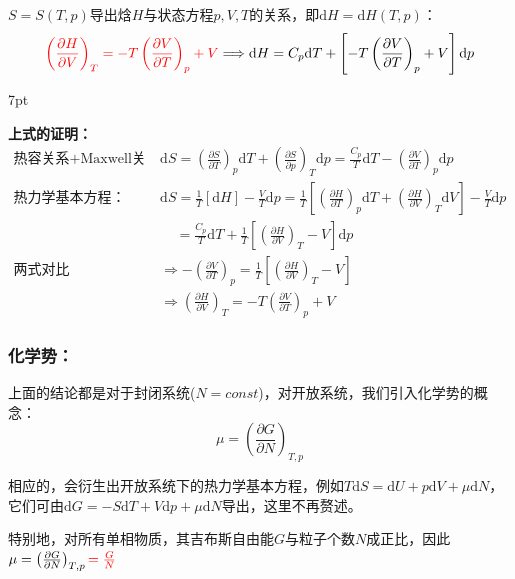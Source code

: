 \documentclass[zihao=5,UTF8]{report}
\newenvironment{graybox}{%
\def\FrameCommand{%
\hspace{1pt}%
{\color{gray}\small \vrule width 2pt}%
{\color{graybox_color}\vrule width 4pt}%
\colorbox{graybox_color}%
}%
\MakeFramed{\advance\hsize-\width\FrameRestore}%
\noindent\hspace{-4.55pt}%
\begin{adjustwidth}{}{7pt}%
\vspace{2pt}\vspace{2pt}%
}
{%
\vspace{2pt}\end{adjustwidth}\endMakeFramed%
}
\begin{document}
\noindent{} $S = S(T,p)$导出焓$H$与状态方程$p,V,T$的关系，即$\mathrm{d}H = \mathrm{d}H(T,p)$：
\begin{equation}
    {\color{red}\left(\frac{\partial H }{\partial V }\right)_{T} = - T\left(\frac{\partial V }{\partial T }\right)_{p} +V}\Longrightarrow \mathrm{d}H = C_p\mathrm{d}T + \left[- T\left(\frac{\partial V }{\partial T }\right)_{p} +V\right]\mathrm{d}p 
\end{equation}
\begin{graybox}
\textbf{上式的证明：}
\begin{align*}
    \text{热容关系+Maxwell关系：}&\mathrm{d}S = \left(\frac{\partial S }{\partial T }\right)_{p}\mathrm{d}T + \left(\frac{\partial S }{\partial p }\right)_{T}\mathrm{d}p=\frac{C_p}{T}\mathrm{d}T - \left(\frac{\partial V }{\partial T }\right)_{p}\mathrm{d}p\\ 
    \text{热力学基本方程：}&\mathrm{d}S =\frac{1}{T}\left[\mathrm{d}H\right] - \frac{V}{T}\mathrm{d}p = \frac{1}{T}\left[ \left(\frac{\partial H }{\partial T  }\right)_{p}\mathrm{d}T + \left(\frac{\partial H }{\partial V }\right)_{T}\mathrm{d}V \right] - \frac{V}{T}\mathrm{d}p \\ 
    &\ \ \ \ \ = \frac{C_p}{T}\mathrm{d}T + \frac{1}{T} \left[\left(\frac{\partial H }{\partial V }\right)_{T} - V\right]\mathrm{d}p\\ 
    \text{两式对比}\ &\Longrightarrow - \left(\frac{\partial V }{\partial T }\right)_{p} =  \frac{1}{T} \left[\left(\frac{\partial H }{\partial V }\right)_{T} - V\right]\\ 
    &\Longrightarrow \left(\frac{\partial H }{\partial V }\right)_{T} = - T\left(\frac{\partial V }{\partial T }\right)_{p} +V
\end{align*}
\end{graybox}

\subsubsection{化学势：}
上面的结论都是对于封闭系统($N = const$)，对开放系统，我们引入化学势的概念：
\begin{equation*}
    \mu = \left(\frac{\partial G }{\partial N }\right)_{T,p}
\end{equation*}
{\par\color{gray}\small
相应的，会衍生出开放系统下的热力学基本方程，例如$T\mathrm{d}S = \mathrm{d}U + p\mathrm{d}V +\mu\mathrm{d}N$，它们可由$\mathrm{d}G = -S\mathrm{d}T +V\mathrm{d}p + \mu\mathrm{d}N$导出，这里不再赘述。\par
\par}
特别地，对所有单相物质，其吉布斯自由能$G$与粒子个数$N$成正比，因此$ \mu = \left(\frac{\partial G }{\partial N }\right)_{T,p} {\color{red}= \frac{G}{N}}$
\end{document}
